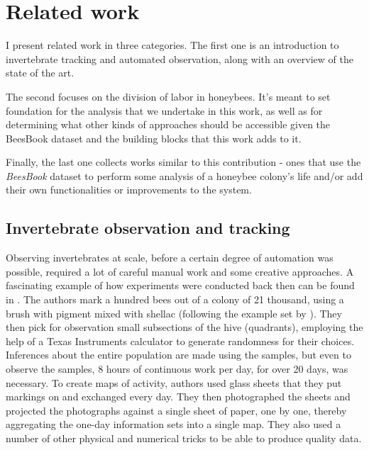 
\chapter{Related work}  %

\ifpdf
    \graphicspath{{Chapters/Chapter2/Figs/Raster/}{Chapters/Chapter2/Figs/PDF/}{Chapters/Chapter2/Figs/}}
\else
    \graphicspath{{Chapters/Chapter2/Figs/Vector/}{Chapters/Chapter2/Figs/}}
\fi

I present related work in three categories. The first one is an introduction to invertebrate tracking 
and automated observation, along with an overview of the state of the art. 

The second focuses on the division of labor in honeybees. It’s meant to set foundation for the analysis 
that we undertake in this work, as well as for determining what other kinds of approaches should be accessible 
given the BeesBook dataset and the building blocks that this work adds to it.

Finally, the last one collects works similar to this contribution - ones that use the \textit{BeesBook} 
dataset to perform some analysis of a honeybee colony’s life and/or add their own functionalities or improvements 
to the system.


\section{Invertebrate observation and tracking} 

Observing invertebrates at scale, before a certain degree of automation was possible, required 
a lot of careful manual work and some creative approaches. A fascinating example of how experiments 
were conducted back then can be found in \citep{seeley_adaptive_1982}. The authors mark a hundred bees out of a 
colony of 21 thousand, using a brush with pigment mixed with shellac (following the example set 
by \citep{von_frisch_tanzsprache_1965}). They then pick for observation small subsections of the hive 
(quadrants), employing the help of a Texas Instruments calculator to generate randomness for their choices. 
Inferences about the entire population are made using the samples, but even to observe the samples, 8 hours 
of continuous work per day, for over 20 days, was necessary. To create maps of activity, authors used glass 
sheets that they put markings on and exchanged every day. They then photographed the sheets and projected the 
photographs against a single sheet of paper, one by one, thereby aggregating the one-day information sets 
into a single map. They also used a number of other physical and numerical tricks to 
be able to produce quality data. 








